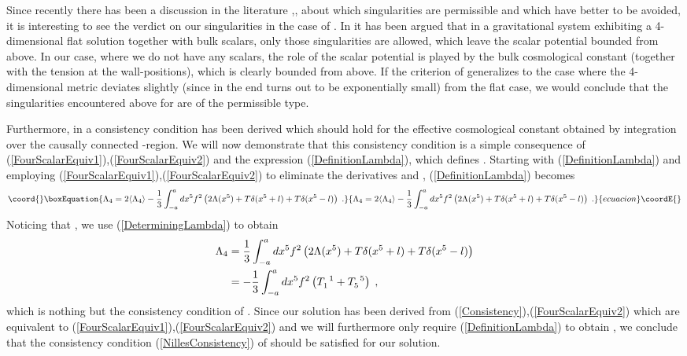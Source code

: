 \documentclass[a4paper,12pt]{article}
\begin{document}
Since recently there has been a discussion in the literature
\cite{Gubser},\cite{FLLN1},\cite{FLLN2} about which singularities are
permissible and which
have better to be avoided, it is interesting to see the verdict on our
singularities in the case of \coordHE{}. In
\cite{Gubser} it has been argued that in a gravitational system exhibiting a
4-dimensional flat solution together with bulk scalars, only those
singularities are allowed, which leave the scalar potential bounded
from above. In our case, where we do not have any scalars, the role of
the scalar potential is played by the bulk cosmological constant
\coordHE{} (together with the tension \coordHE{} at the wall-positions),
which is clearly bounded from above.  If the criterion of
\cite{Gubser} generalizes to the case where the 4-dimensional metric
deviates slightly (since in the end \coordHE{} turns out to be
exponentially small) from the flat case, we would conclude that the
singularities encountered above for \coordHE{} are of the permissible type.

Furthermore, in \cite{FLLN2} a consistency condition has been derived which
should hold for the effective cosmological constant obtained by integration
over the causally connected \coordHE{}-region. We will now demonstrate that this
consistency condition is a simple consequence of
(\ref{FourScalarEquiv1}),(\ref{FourScalarEquiv2}) and the expression
(\ref{DefinitionLambda}), which defines \coordHE{}. Starting with
(\ref{DefinitionLambda}) and employing
(\ref{FourScalarEquiv1}),(\ref{FourScalarEquiv2}) to eliminate the derivatives
\coordHE{} and \coordHE{}, (\ref{DefinitionLambda}) becomes
\begin{equation}\coord{}\boxEquation{
  \Lambda_4 = 2\langle \Lambda_4 \rangle
             -\frac{1}{3}\int_{-a}^a dx^5 f^2 \left( 2\Lambda(x^5)
             +T\delta(x^5+l)+T\delta(x^5-l)\right) \; .
}{
  \Lambda_4 = 2\langle \Lambda_4 \rangle
             -\frac{1}{3}\int_{-a}^a dx^5 f^2 \left( 2\Lambda(x^5)
             +T\delta(x^5+l)+T\delta(x^5-l)\right) \; .
}{ecuacion}\coordE{}\end{equation}  
Noticing that \coordHE{}, we use (\ref{DeterminingLambda}) to
obtain
\begin{alignat}{3}
  \Lambda_4 &= \frac{1}{3}\int_{-a}^a dx^5 f^2 \left( 2\Lambda(x^5)
              +T\delta(x^5+l)+T\delta(x^5-l)\right) \notag \\
            &= -\frac{1}{3}\int_{-a}^a dx^5 f^2 
               \left( T_1^{\phantom{1}1}+T_5^{\phantom{5}5} \right) \; ,
  \label{NillesConsistency}
\end{alignat}
which is nothing but the consistency condition of \cite{FLLN2}. Since
our solution has been derived from
(\ref{Consistency}),(\ref{FourScalarEquiv2}) which are equivalent to
(\ref{FourScalarEquiv1}),(\ref{FourScalarEquiv2}) and we will furthermore only
require
(\ref{DefinitionLambda}) to obtain \coordHE{}, we conclude that the
consistency condition (\ref{NillesConsistency}) of \cite{FLLN2} should be
satisfied for our solution.
\end{document}
